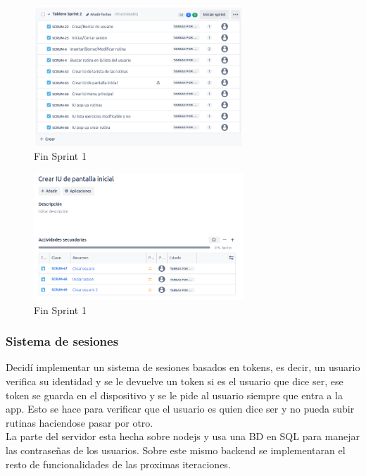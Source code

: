\begin{figure}[h!]
  \centering
  \includegraphics[width=0.7\textwidth]{fotos/PreSprint2.png}
  \caption{Fin Sprint 1}
  \label{fig:imagen}
\end{figure}

\begin{figure}[h!]
  \centering
  \includegraphics[width=0.7\textwidth]{fotos/SubListPre2.png}
  \caption{Fin Sprint 1}
  \label{fig:imagen}
\end{figure}

\clearpage

\subsubsection{Sistema de sesiones}
Decidí implementar un sistema de sesiones basados en tokens, es decir, un usuario verifica su identidad y se le devuelve un token si es el usuario que dice ser, ese token se guarda en el dispositivo y se le pide al usuario siempre que entra a la app. Esto se hace para verificar que el usuario es quien dice ser y no pueda subir rutinas haciendose pasar por otro.\\
La parte del servidor esta hecha sobre nodejs y usa una BD en SQL para manejar las contraseñas de los usuarios. Sobre este mismo backend se implementaran el resto de funcionalidades de las proximas iteraciones.

